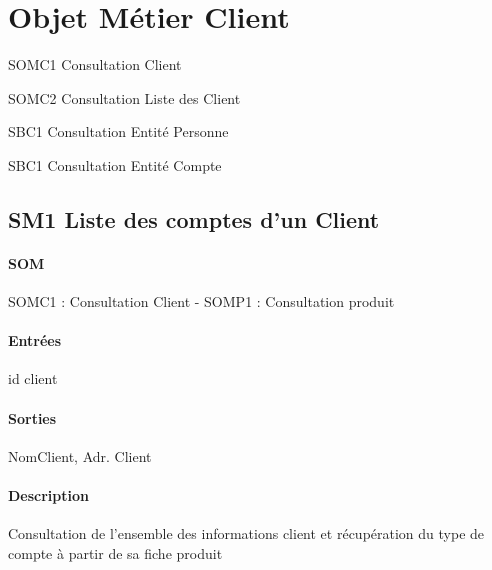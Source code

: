 \section{Objet Métier Client}

\begin{description}
\item{SOMC1 Consultation Client}
\item{SOMC2 Consultation Liste des Client}

\item{SBC1 Consultation Entité Personne}
\item{SBC1 Consultation Entité Compte}
\end{description}

\subsection{SM1 Liste des comptes d'un Client}
\paragraph{SOM} SOMC1 : Consultation Client - SOMP1 : Consultation produit
\paragraph{Entrées} id client
\paragraph{Sorties} NomClient, Adr. Client
\paragraph{Description}
Consultation de l'ensemble des informations client et récupération du type de compte à partir de sa fiche produit

